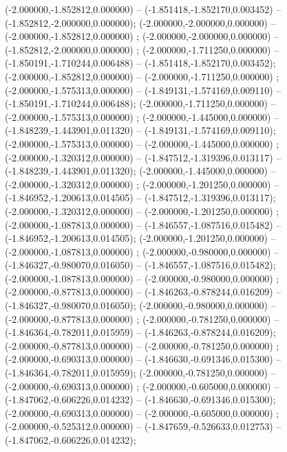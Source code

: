  (-2.000000,-1.852812,0.000000) -- (-1.851418,-1.852170,0.003452) -- (-1.852812,-2.000000,0.000000);
 (-2.000000,-2.000000,0.000000) -- (-2.000000,-1.852812,0.000000) ;
 (-2.000000,-2.000000,0.000000) -- (-1.852812,-2.000000,0.000000) ;
 (-2.000000,-1.711250,0.000000) -- (-1.850191,-1.710244,0.006488) -- (-1.851418,-1.852170,0.003452);
 (-2.000000,-1.852812,0.000000) -- (-2.000000,-1.711250,0.000000) ;
 (-2.000000,-1.575313,0.000000) -- (-1.849131,-1.574169,0.009110) -- (-1.850191,-1.710244,0.006488);
 (-2.000000,-1.711250,0.000000) -- (-2.000000,-1.575313,0.000000) ;
 (-2.000000,-1.445000,0.000000) -- (-1.848239,-1.443901,0.011320) -- (-1.849131,-1.574169,0.009110);
 (-2.000000,-1.575313,0.000000) -- (-2.000000,-1.445000,0.000000) ;
 (-2.000000,-1.320312,0.000000) -- (-1.847512,-1.319396,0.013117) -- (-1.848239,-1.443901,0.011320);
 (-2.000000,-1.445000,0.000000) -- (-2.000000,-1.320312,0.000000) ;
 (-2.000000,-1.201250,0.000000) -- (-1.846952,-1.200613,0.014505) -- (-1.847512,-1.319396,0.013117);
 (-2.000000,-1.320312,0.000000) -- (-2.000000,-1.201250,0.000000) ;
 (-2.000000,-1.087813,0.000000) -- (-1.846557,-1.087516,0.015482) -- (-1.846952,-1.200613,0.014505);
 (-2.000000,-1.201250,0.000000) -- (-2.000000,-1.087813,0.000000) ;
 (-2.000000,-0.980000,0.000000) -- (-1.846327,-0.980070,0.016050) -- (-1.846557,-1.087516,0.015482);
 (-2.000000,-1.087813,0.000000) -- (-2.000000,-0.980000,0.000000) ;
 (-2.000000,-0.877813,0.000000) -- (-1.846263,-0.878244,0.016209) -- (-1.846327,-0.980070,0.016050);
 (-2.000000,-0.980000,0.000000) -- (-2.000000,-0.877813,0.000000) ;
 (-2.000000,-0.781250,0.000000) -- (-1.846364,-0.782011,0.015959) -- (-1.846263,-0.878244,0.016209);
 (-2.000000,-0.877813,0.000000) -- (-2.000000,-0.781250,0.000000) ;
 (-2.000000,-0.690313,0.000000) -- (-1.846630,-0.691346,0.015300) -- (-1.846364,-0.782011,0.015959);
 (-2.000000,-0.781250,0.000000) -- (-2.000000,-0.690313,0.000000) ;
 (-2.000000,-0.605000,0.000000) -- (-1.847062,-0.606226,0.014232) -- (-1.846630,-0.691346,0.015300);
 (-2.000000,-0.690313,0.000000) -- (-2.000000,-0.605000,0.000000) ;
 (-2.000000,-0.525312,0.000000) -- (-1.847659,-0.526633,0.012753) -- (-1.847062,-0.606226,0.014232);
